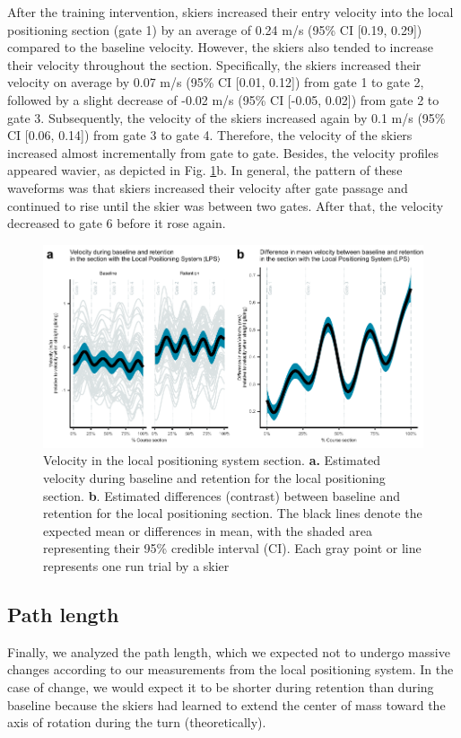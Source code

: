 \documentclass{article}
\begin{document}
After the training intervention, skiers increased their entry velocity into the local positioning section (gate 1) by an average of 0.24 m/s (95\% CI [0.19, 0.29]) compared to the baseline velocity. However, the skiers also tended to increase their velocity throughout the section. Specifically, the skiers increased their velocity on average by 0.07 m/s (95\% CI [0.01, 0.12]) from gate 1 to gate 2, followed by a slight decrease of -0.02 m/s (95\% CI [-0.05, 0.02]) from gate 2 to gate 3. Subsequently, the velocity of the skiers increased again by 0.1 m/s (95\% CI [0.06, 0.14]) from gate 3 to gate 4. Therefore, the velocity of the skiers increased almost incrementally from gate to gate. Besides, the velocity profiles appeared wavier, as depicted in Fig. \ref{fig: velocity}b. In general, the pattern of these waveforms was that skiers increased their velocity after gate passage and continued to rise until the skier was between two gates. After that, the velocity decreased to gate 6 before it rose again. 

\begin{figure}
    \centering
    \includegraphics[width=1\linewidth]{figurer/figure_velocity_2.pdf}
    \caption{Velocity in the local positioning system section. \textbf{a.} Estimated velocity during baseline and retention for the local positioning section. \textbf{b}. Estimated differences (contrast) between baseline and retention for the local positioning section. The black lines denote the expected mean or differences in mean, with the shaded area representing their 95\% credible interval (CI). Each gray point or line represents one run trial by a skier}
    \label{fig: velocity}
\end{figure}

\subsection{Path length}
Finally, we analyzed the path length, which we expected not to undergo massive changes according to our measurements from the local positioning system. In the case of change, we would expect it to be shorter during retention than during baseline because the skiers had learned to extend the center of mass toward the axis of rotation during the turn (theoretically).
\end{document}
